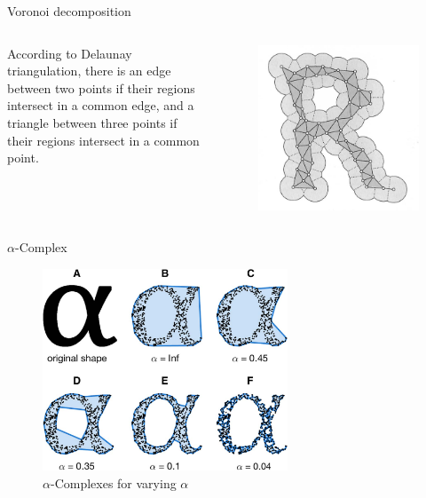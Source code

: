 \begin{frame}{Voronoi decomposition}

    \begin{columns}
According to Delaunay triangulation, there is an edge between two points if
their regions intersect in a common edge, and a triangle between three
points if their regions intersect in a common point.
        \begin{figure}
            \centering
            \includegraphics[width=\textwidth]{figs/L14-voronoi.jpg}
        \end{figure}
    \end{columns}
\end{frame}

\begin{frame}{$\alpha$-Complex}
        \begin{figure}
            \centering
            \includegraphics[width=0.65\textwidth]{figs/L14-alpha-complexes-varying-alpha.jpg}
            \caption{$\alpha$-Complexes for varying $\alpha$}
        \end{figure}
\end{frame}

